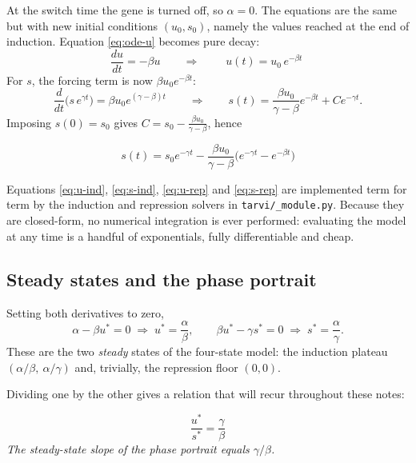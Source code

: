 \documentclass[11pt,a4paper]{article}
\newenvironment{keybox}{\begin{shaded}\noindent}{\end{shaded}}
\newcommand{\uns}{u}
\newcommand{\spl}{s}
\theoremstyle{definition}
\begin{document}
At the switch time the gene is turned off, so $\alpha = 0$. The equations are
the same but with new initial conditions $(\uns_0, \spl_0)$, namely the values
reached at the end of induction. Equation \eqref{eq:ode-u} becomes pure decay:
%
\begin{equation}
\frac{d\uns}{dt} = -\beta \uns
\qquad\Longrightarrow\qquad
\boxed{\;\uns(t) = \uns_0\, e^{-\beta t}\;}
\label{eq:u-rep}
\end{equation}
%
For $\spl$, the forcing term is now $\beta \uns_0 e^{-\beta t}$:
%
\begin{equation}
\frac{d}{dt}\Big(\spl\, e^{\gamma t}\Big) = \beta \uns_0 e^{(\gamma - \beta)t}
\qquad\Longrightarrow\qquad
\spl(t) = \frac{\beta \uns_0}{\gamma - \beta}e^{-\beta t} + Ce^{-\gamma t}.
\end{equation}
%
Imposing $\spl(0) = \spl_0$ gives
$C = \spl_0 - \frac{\beta \uns_0}{\gamma - \beta}$, hence
%
\begin{keybox}
\begin{equation}
\boxed{\;\spl(t) = \spl_0 e^{-\gamma t}
- \frac{\beta \uns_0}{\gamma - \beta}\Big(e^{-\gamma t} - e^{-\beta t}\Big)\;}
\label{eq:s-rep}
\end{equation}
\end{keybox}

Equations \eqref{eq:u-ind}, \eqref{eq:s-ind}, \eqref{eq:u-rep} and
\eqref{eq:s-rep} are implemented term for term by the induction and repression
solvers in \texttt{tarvi/\_module.py}. Because they are closed-form, no
numerical integration is ever performed: evaluating the model at any time is a
handful of exponentials, fully differentiable and cheap.

\subsection{Steady states and the phase portrait}
\label{sec:steady}

Setting both derivatives to zero,
%
\begin{equation}
\alpha - \beta \uns^{*} = 0 \;\Rightarrow\; \uns^{*} = \frac{\alpha}{\beta},
\qquad
\beta \uns^{*} - \gamma \spl^{*} = 0 \;\Rightarrow\; \spl^{*} = \frac{\alpha}{\gamma}.
\end{equation}
%
These are the two \emph{steady} states of the four-state model: the induction
plateau $(\alpha/\beta,\ \alpha/\gamma)$ and, trivially, the repression floor
$(0, 0)$.

Dividing one by the other gives a relation that will recur throughout these
notes:
%
\begin{keybox}
\begin{equation}
\frac{\uns^{*}}{\spl^{*}} = \frac{\gamma}{\beta}
\label{eq:ss-slope}
\end{equation}
\emph{The steady-state slope of the phase portrait equals $\gamma/\beta$.}
\end{keybox}
\end{document}
